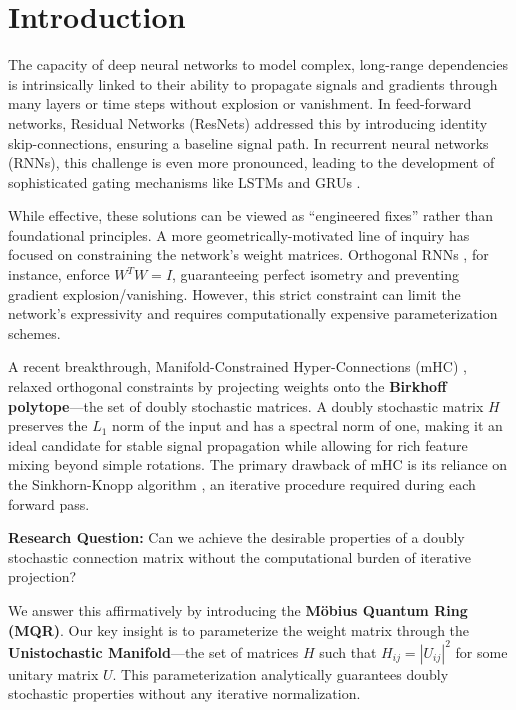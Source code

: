 \documentclass[11pt,a4paper]{article}
\begin{document}
\section{Introduction}
\label{sec:introduction}

The capacity of deep neural networks to model complex, long-range dependencies is intrinsically linked to their ability to propagate signals and gradients through many layers or time steps without explosion or vanishment. In feed-forward networks, Residual Networks (ResNets) \citep{he2016deep} addressed this by introducing identity skip-connections, ensuring a baseline signal path. In recurrent neural networks (RNNs), this challenge is even more pronounced, leading to the development of sophisticated gating mechanisms like LSTMs \citep{hochreiter1997long} and GRUs \citep{cho2014learning}.

While effective, these solutions can be viewed as ``engineered fixes'' rather than foundational principles. A more geometrically-motivated line of inquiry has focused on constraining the network's weight matrices. Orthogonal RNNs \citep{arjovsky2016unitary,wisdom2016full}, for instance, enforce $W^T W = I$, guaranteeing perfect isometry and preventing gradient explosion/vanishing. However, this strict constraint can limit the network's expressivity and requires computationally expensive parameterization schemes.

A recent breakthrough, Manifold-Constrained Hyper-Connections (mHC) \citep{wang2025sparse}, relaxed orthogonal constraints by projecting weights onto the \textbf{Birkhoff polytope}---the set of doubly stochastic matrices. A doubly stochastic matrix $H$ preserves the $L_1$ norm of the input and has a spectral norm of one, making it an ideal candidate for stable signal propagation while allowing for rich feature mixing beyond simple rotations. The primary drawback of mHC is its reliance on the Sinkhorn-Knopp algorithm \citep{sinkhorn1967concerning}, an iterative procedure required during each forward pass.

\textbf{Research Question:} Can we achieve the desirable properties of a doubly stochastic connection matrix without the computational burden of iterative projection?

We answer this affirmatively by introducing the \textbf{Möbius Quantum Ring (MQR)}. Our key insight is to parameterize the weight matrix through the \textbf{Unistochastic Manifold}---the set of matrices $H$ such that $H_{ij} = |U_{ij}|^2$ for some unitary matrix $U$. This parameterization analytically guarantees doubly stochastic properties without any iterative normalization.
\end{document}
